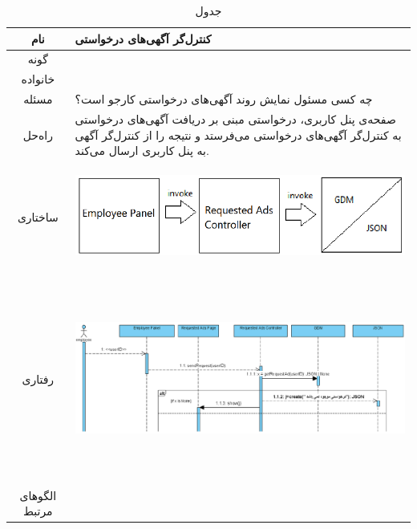 \begin{table}[H]
	\begin{adjustbox}{width=\textwidth}
		\begin{tabular}{|c|p{\textwidth}|}
			\hline
			نام &
			کنترل‌گر آگهی‌های درخواستی \\ 
			\hline
			گونه & 
			\grasp \\
			\hline
			خانواده &
			\controller \\
			\hline
			مسئله & 
			چه کسی مسئول نمایش روند آگهی‌های درخواستی کارجو است؟\\
			\hline
			راه‌حل& 
			صفحه‌ی پنل ‌کاربری، درخواستی مبنی بر دریافت آگهی‌های درخواستی به کنترل‌گر آگهی‌های درخواستی می‌فرستد و نتیجه را از کنترل‌گر آگهی به پنل کاربری ارسال می‌کند. \\
			\hline
			ساختاری & 
			\begin{minipage}{\textwidth}
				\begin{flushleft}
					\begin{minipage}{\textwidth}
						\includegraphics[width=13cm, height=2.7cm]{./images/7-5-1}
					\end{minipage}
				\end{flushleft}
			\end{minipage}
			
			\\
			\hline
			رفتاری & 
			\begin{minipage}{\textwidth}
				\begin{flushleft}
					\begin{minipage}{\textwidth}
						\includegraphics[width=13.5cm, height=6cm]{./images/7-5-2}
					\end{minipage}
				\end{flushleft}
			\end{minipage}
			\\
			\hline
			الگو‌های مرتبط& \\
			\hline
		\end{tabular}
	\end{adjustbox}
	\caption{جدول }
	\label{table-with-pic:5}
\end{table}

